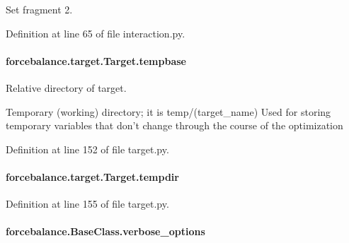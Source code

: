 Set fragment 2. 



Definition at line 65 of file interaction.\-py.

\hypertarget{classforcebalance_1_1target_1_1Target_ae5b544d3e11365865813ef3d626ef81d}{
\paragraph[{tempbase}]{\setlength{\rightskip}{0pt plus 5cm}forcebalance.\-target.\-Target.\-tempbase\hspace{0.3cm}{\ttfamily [inherited]}}}\label{classforcebalance_1_1target_1_1Target_ae5b544d3e11365865813ef3d626ef81d}


Relative directory of target. 

Temporary (working) directory; it is temp/(target\-\_\-name) Used for storing temporary variables that don't change through the course of the optimization 

Definition at line 152 of file target.\-py.

\hypertarget{classforcebalance_1_1target_1_1Target_aa1f01b5b78db253b5b66384ed11ed193}{
\paragraph[{tempdir}]{\setlength{\rightskip}{0pt plus 5cm}forcebalance.\-target.\-Target.\-tempdir\hspace{0.3cm}{\ttfamily [inherited]}}}\label{classforcebalance_1_1target_1_1Target_aa1f01b5b78db253b5b66384ed11ed193}


Definition at line 155 of file target.\-py.

\hypertarget{classforcebalance_1_1BaseClass_afd68efa29ccd2f320f4cf82198214aac}{
\paragraph[{verbose\-\_\-options}]{\setlength{\rightskip}{0pt plus 5cm}forcebalance.\-Base\-Class.\-verbose\-\_\-options\hspace{0.3cm}{\ttfamily [inherited]}}}\label{classforcebalance_1_1BaseClass_afd68efa29ccd2f320f4cf82198214aac}


